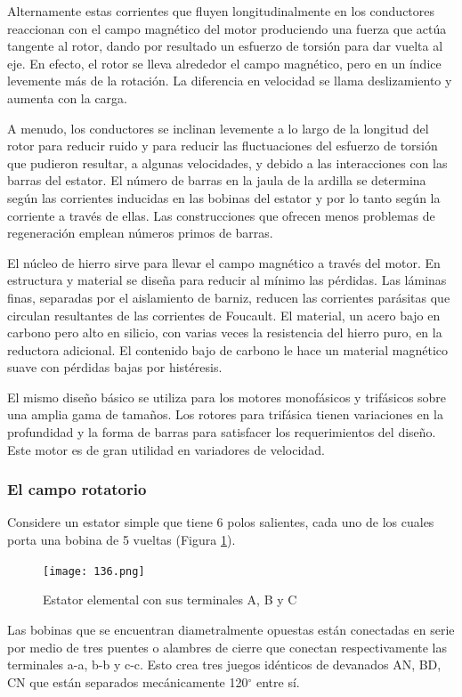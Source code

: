 \documentclass[a4paper,12pt]{article}
\begin{document}
Alternamente estas corrientes que fluyen longitudinalmente en los conductores reaccionan con el campo magnético del motor produciendo una fuerza que actúa tangente al rotor, dando por resultado un esfuerzo de torsión para dar vuelta al eje. En efecto, el rotor se lleva alrededor el campo magnético, pero en un índice levemente más de la rotación. La diferencia en velocidad se llama deslizamiento y aumenta con la carga.

A menudo, los conductores se inclinan levemente a lo largo de la longitud del rotor para reducir ruido y para reducir las fluctuaciones del esfuerzo de torsión que pudieron resultar, a algunas velocidades, y debido a las interacciones con las barras del estator. El número de barras en la jaula de la ardilla se determina según las corrientes inducidas en las bobinas del estator y por lo tanto según la corriente a través de ellas. Las construcciones que ofrecen menos problemas de regeneración emplean números primos de barras.

El núcleo de hierro sirve para llevar el campo magnético a través del motor. En estructura y material se diseña para reducir al mínimo las pérdidas. Las láminas finas, separadas por el aislamiento de barniz, reducen las corrientes parásitas que circulan resultantes de las corrientes de Foucault. El material, un acero bajo en carbono pero alto en silicio, con varias veces la resistencia del hierro puro, en la reductora adicional. El contenido bajo de carbono le hace un material magnético suave con pérdidas bajas por histéresis.

El mismo diseño básico se utiliza para los motores monofásicos y trifásicos sobre una amplia gama de tamaños. Los rotores para trifásica tienen variaciones en la profundidad y la forma de barras para satisfacer los requerimientos del diseño. Este motor es de gran utilidad en variadores de velocidad.
\subsubsection{El campo rotatorio}
Considere un estator simple que tiene 6 polos salientes, cada uno de los cuales porta una bobina de 5 vueltas (Figura \ref{136}).
\begin{figure}
    \centering
    \texttt{[image: 136.png]}
    \caption{Estator elemental con sus terminales A, B y C}
    \label{136}
\end{figure}
Las bobinas que se encuentran diametralmente opuestas están conectadas en serie por medio de tres puentes o alambres de cierre que conectan respectivamente las terminales a-a, b-b y c-c. Esto crea tres juegos idénticos de devanados AN, BD, CN que están separados mecánicamente 120$^{\circ}$ entre sí.
\end{document}
